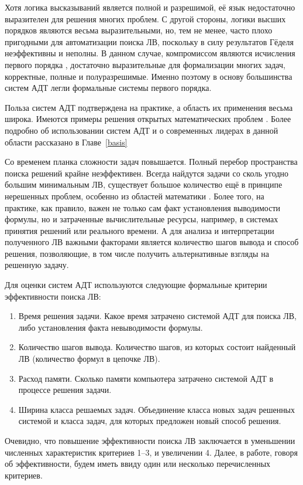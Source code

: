 Хотя логика высказываний является полной и разрешимой, её язык недостаточно выразителен для решения многих проблем. С другой стороны, логики высших порядков являются весьма выразительными, но, тем не менее, часто плохо пригодными для автоматизации поиска ЛВ, поскольку в силу результатов Гёделя неэффективны и неполны. В данном случае, компромиссом являются исчисления первого порядка \cite{Frege, Sourcebook, mendelson}, достаточно выразительные для формализации многих задач, корректные, полные и полуразрешимые. Именно поэтому в основу большинства систем АДТ легли формальные системы первого порядка.

Польза систем АДТ подтверждена на практике, а область их применения весьма широка. Имеются примеры решения открытых математических проблем \cite{McCuneRob}. Более подробно об использовании систем АДТ и о современных лидерах в данной области рассказано в Главе~\ref{basis}

Со временем планка сложности задач повышается. Полный перебор пространства поиска решений крайне неэффективен. Всегда найдутся задачи со сколь угодно большим минимальным ЛВ, существует большое количество ещё в принципе нерешенных проблем, особенно из областей математики \cite{tptp}. Более того, на практике, как правило, важен не только сам факт установления выводимости формулы, но и затраченные вычислительные ресурсы, например, в системах принятия решений или реального времени. А для анализа и интерпретации полученного ЛВ важными факторами является количество шагов вывода и способ решения, позволяющие, в том числе получить альтернативные взгляды на решенную задачу.

Для оценки систем АДТ используются следующие формальные критерии эффективности поиска ЛВ:
\label{pg:criterion}
\begin{enumerate}
\item{Время решения задачи.} Какое время затрачено системой АДТ для поиска ЛВ, либо установления факта невыводимости формулы.
\item{Количество шагов вывода.} Количество шагов, из которых состоит найденный ЛВ (количество формул в цепочке ЛВ).
\item{Расход памяти.} Сколько памяти компьютера затрачено системой АДТ в процессе решения задачи.
\item{Ширина класса решаемых задач.} Объединение класса новых задач решенных системой и класса задач, для которых предложен новый способ решения.
\end{enumerate}

Очевидно, что повышение эффективности поиска ЛВ заключается в уменьшении численных характеристик критериев 1--3, и увеличении 4. Далее, в работе, говоря об эффективности, будем иметь ввиду один или несколько перечисленных критериев. 

